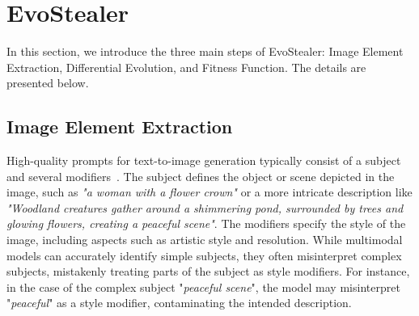 \section{EvoStealer}
In this section, we introduce the three main steps of EvoStealer: Image Element Extraction, Differential Evolution, and Fitness Function. The details are presented below.



\subsection{Image Element Extraction}
High-quality prompts for text-to-image generation typically consist of a subject and several modifiers~\citep{liu2022design,oppenlaender2024taxonomy}. The subject defines the object or scene depicted in the image, such as \textit{"a woman with a flower crown"} or a more intricate description like \textit{"Woodland creatures gather around a shimmering pond, surrounded by trees and glowing flowers, creating a peaceful scene"}. The modifiers specify the style of the image, including aspects such as artistic style and resolution. While multimodal models can accurately identify simple subjects, they often misinterpret complex subjects, mistakenly treating parts of the subject as style modifiers. For instance, in the case of the complex subject "\textit{peaceful scene}", the model may misinterpret "\textit{peaceful}" as a style modifier, contaminating the intended description.


